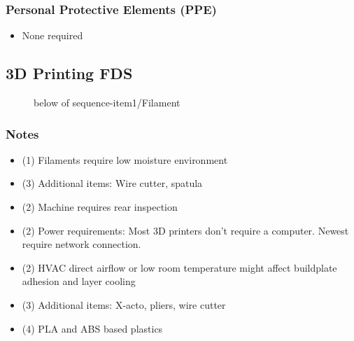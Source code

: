\documentclass[a4paper,12pt,titlepage]{article}
\begin{document}
\subsubsection*{Personal Protective Elements (PPE)}
\begin{itemize}
\item None required
\end{itemize}
\clearpage

\subsection{3D Printing FDS}
\begin{figure}[h]

\centering
{}
{below of sequence-item1/Filament}
\vspace{1cm}
\end{figure}
\subsubsection*{Notes}
\begin{itemize}
\item (1) Filaments require low moisture environment
\item (3) Additional items: Wire cutter, spatula
\item (2) Machine requires rear inspection
\item (2) Power requirements: Most 3D printers don't require a computer. Newest require network connection.
\item (2) HVAC direct airflow or low room temperature might affect buildplate adhesion and layer cooling
\item (3) Additional items: X-acto, pliers, wire cutter
\item (4) PLA and ABS based plastics
\end{itemize}
\end{document}
